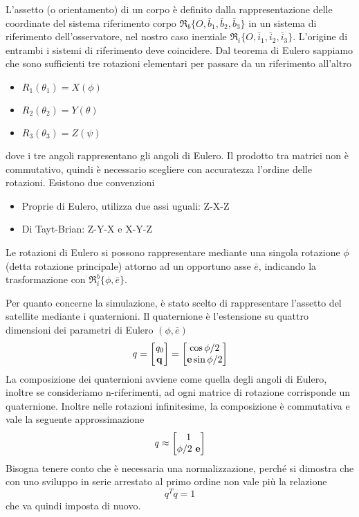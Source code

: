 L'assetto (o orientamento) di un corpo è definito dalla rappresentazione delle
coordinate del sistema riferimento corpo
$\mathfrak{R}_b\{O,\bar{b}_1,\bar{b}_2,\bar{b}_3\}$ in un sistema di riferimento
dell'osservatore, nel nostro caso inerziale
$\mathfrak{R}_i\{O,\bar{i}_1,\bar{i}_2,\bar{i}_3\}$. L'origine di entrambi i
sistemi di riferimento deve coincidere. Dal teorema di Eulero sappiamo che sono
sufficienti tre rotazioni elementari per passare da un riferimento all'altro
\begin{itemize}
  \item $R_1(\theta_1)=X(\phi)$
  \item $R_2(\theta_2)=Y(\theta)$
  \item $R_3(\theta_3)=Z(\psi)$
\end{itemize}
dove i tre angoli rappresentano gli angoli di Eulero. Il prodotto tra matrici
non è commutativo, quindi è necessario scegliere con accuratezza l'ordine delle
rotazioni. Esistono due convenzioni
\begin{itemize}
  \item Proprie di Eulero, utilizza due assi uguali: Z-X-Z
  \item Di Tayt-Brian: Z-Y-X e X-Y-Z
\end{itemize}
Le rotazioni di Eulero si possono rappresentare mediante una singola rotazione
$\phi$ (detta rotazione principale) attorno ad un opportuno asse $\bar{e}$,
indicando la trasformazione con $\mathfrak{R}_i^b\{\phi,\bar{e}\}$.

Per quanto concerne la simulazione, è stato scelto di rappresentare l'assetto
del satellite mediante i quaternioni.
Il quaternione è l'estensione su quattro dimensioni dei parametri di Eulero
$(\phi,\bar{e})$
\begin{equation}
\mathit{q}=\begin{bmatrix}
\mathit{q}_0 \\ \mathit{\bf q}
\end{bmatrix} =\begin{bmatrix}
\cos{\phi/2} \\ {\bf e}\sin{\phi/2}
\end{bmatrix}
\end{equation}
La composizione dei quaternioni avviene come quella degli angoli di Eulero,
inoltre se consideriamo n-riferimenti, ad ogni matrice di rotazione corrisponde
un quaternione. Inoltre nelle rotazioni infinitesime, la composizione è commutativa
e vale la seguente approssimazione
\begin{equation}
\mathit{q}\approx
\begin{bmatrix}
1\\ \phi/2 \ {\bf e}
\end{bmatrix}
\end{equation}
Bisogna tenere conto che è necessaria una normalizzazione, perché si
dimostra che con uno sviluppo in serie arrestato al
primo ordine non vale più la relazione
\begin{equation}
\mathit{q}^T\mathit{q}=1
\end{equation}
che va quindi imposta di nuovo.


